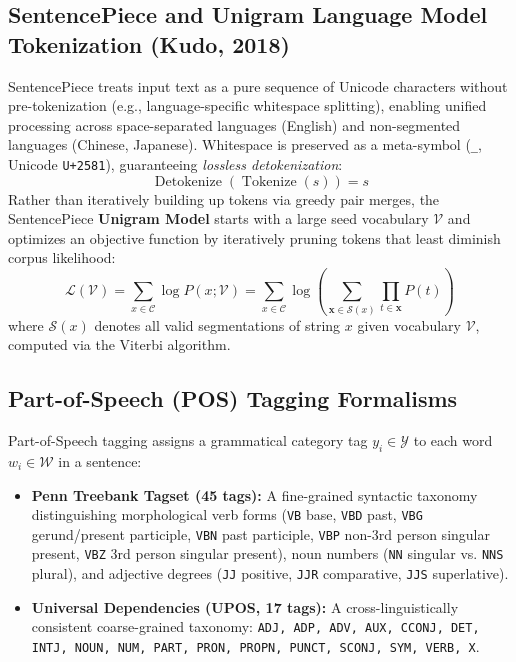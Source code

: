 \subsection{SentencePiece and Unigram Language Model Tokenization (Kudo, 2018)}
SentencePiece treats input text as a pure sequence of Unicode characters without pre-tokenization (e.g., language-specific whitespace splitting), enabling unified processing across space-separated languages (English) and non-segmented languages (Chinese, Japanese). Whitespace is preserved as a meta-symbol (\texttt{\_}, Unicode \texttt{U+2581}), guaranteeing \textit{lossless detokenization}:
\begin{equation}
    \operatorname{Detokenize}(\operatorname{Tokenize}(s)) = s
\end{equation}
Rather than iteratively building up tokens via greedy pair merges, the SentencePiece \textbf{Unigram Model} starts with a large seed vocabulary $\mathcal{V}$ and optimizes an objective function by iteratively pruning tokens that least diminish corpus likelihood:
\begin{equation}
    \mathcal{L}(\mathcal{V}) = \sum_{x \in \mathcal{C}} \log P(x; \mathcal{V}) = \sum_{x \in \mathcal{C}} \log \left( \sum_{\mathbf{x} \in \mathcal{S}(x)} \prod_{t \in \mathbf{x}} P(t) \right)
\end{equation}
where $\mathcal{S}(x)$ denotes all valid segmentations of string $x$ given vocabulary $\mathcal{V}$, computed via the Viterbi algorithm.

\subsection{Part-of-Speech (POS) Tagging Formalisms}
Part-of-Speech tagging assigns a grammatical category tag $y_i \in \mathcal{Y}$ to each word $w_i \in \mathcal{W}$ in a sentence:
\begin{itemize}
    \item \textbf{Penn Treebank Tagset (45 tags):} A fine-grained syntactic taxonomy distinguishing morphological verb forms (\texttt{VB} base, \texttt{VBD} past, \texttt{VBG} gerund/present participle, \texttt{VBN} past participle, \texttt{VBP} non-3rd person singular present, \texttt{VBZ} 3rd person singular present), noun numbers (\texttt{NN} singular vs. \texttt{NNS} plural), and adjective degrees (\texttt{JJ} positive, \texttt{JJR} comparative, \texttt{JJS} superlative).
    \item \textbf{Universal Dependencies (UPOS, 17 tags):} A cross-linguistically consistent coarse-grained taxonomy: \texttt{ADJ, ADP, ADV, AUX, CCONJ, DET, INTJ, NOUN, NUM, PART, PRON, PROPN, PUNCT, SCONJ, SYM, VERB, X}.
\end{itemize}

